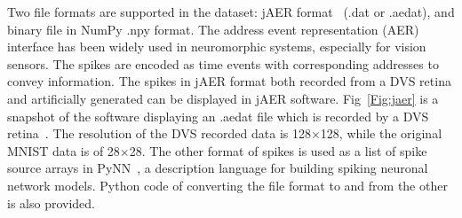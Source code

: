 Two file formats are supported in the dataset: jAER format~\cite{delbruck2008frame} (.dat or .aedat), and binary file in NumPy .npy format.
The  address event representation (AER) interface has been widely used in neuromorphic systems, especially for vision sensors.
The spikes are encoded as time events with corresponding addresses to convey information.
The spikes in jAER format both recorded from a DVS retina and artificially generated can be displayed in jAER software.
Fig~\ref{Fig:jaer} is a snapshot of the software displaying an .aedat file which is recorded by a DVS retina~\cite{serrano-gotarredona_128_2013}.
The resolution of the DVS recorded data is 128$\times$128, while the original MNIST data is of 28$\times$28.
The other format of spikes is used as a list of spike source arrays in PyNN~\cite{davison2008pynn}, a description language for building spiking neuronal network models.
Python code of converting the file format to and from the other is also provided.
%	
